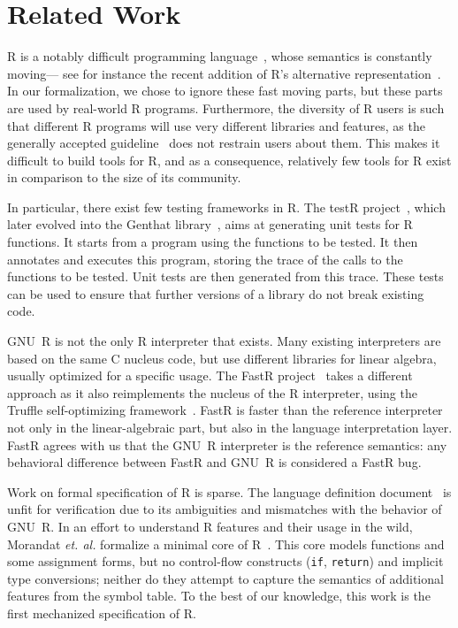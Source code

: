\documentclass[
    sigplan,
    10pt,
    review, %
    natbib=false %
 ]{acmart}
\newcommand\newtext[1]{{\color{blue} #1}}
\begin{document}
\section{Related Work}
\label{sec:related:work}

R is a notably difficult programming language~\parencite{RInferno},
whose semantics is constantly moving---%
see for instance the recent addition
of R's alternative representation~\parencite{altrepR}.
In our formalization, we chose to ignore these fast moving parts,
but these parts are used by real-world R programs.
Furthermore, the diversity of R users is such that different R programs
will use very different libraries and features,
as the generally accepted guideline~\parencite{RGuidelines}
does not restrain users about them.
This makes it difficult to build tools for R,
and as a consequence, relatively few tools for R exist
in comparison to the size of its community.

In particular,
there exist few testing frameworks in R.
The testR project~\parencite{maj2013testr, 2014testr},
which later evolved into the Genthat library~\parencite{genthat},
aims at generating unit tests for R functions.
It starts from a program using the functions to be tested.
It then annotates and executes this program,
storing the trace of the calls to the functions to be tested.
Unit tests are then generated from this trace.
These tests can be used
to ensure that further versions of a library
do not break existing code.

GNU~R is not the only R interpreter that exists.
Many existing interpreters are based on the same C nucleus code,
but use different libraries for linear algebra,
usually optimized for a specific usage.
%
The FastR project~\parencite{kalibera2014fast} takes a different approach
as it also reimplements the nucleus of the R interpreter, using the Truffle self-optimizing framework~\parencite{wuerthingertruffle}.
FastR is faster than the reference interpreter not only in the linear-algebraic part, but also in the language interpretation layer.
%
FastR agrees with us that the GNU~R interpreter is the reference semantics: any behavioral difference between FastR and GNU~R is considered a FastR bug.

\newtext{
Work on formal specification of R is sparse.
%
The language definition document~\parencite{team2000r}
is unfit for verification due to its ambiguities and mismatches with the behavior of GNU~R.
%
In an effort to understand R features and their usage in the wild, Morandat \emph{et. al.} formalize a minimal core of R~\parencite{morandat2012evaluating}. This core models functions and some assignment forms, but no control-flow constructs (\texttt{if}, \texttt{return}) and implicit type conversions; neither do they attempt to capture the semantics of additional features from the symbol table.
}
%
To the best of our knowledge, this work is the first mechanized specification of R.
\end{document}
